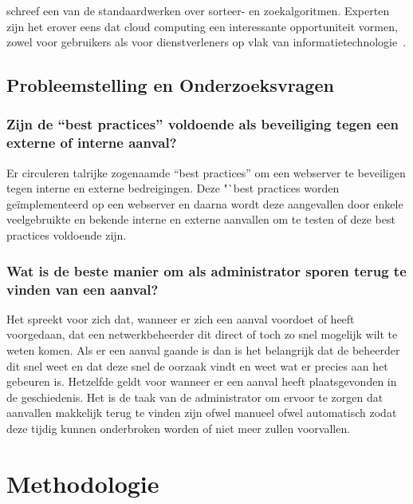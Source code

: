 \documentclass[pdftex,a4paper,12pt]{report}
\begin{document}
\cite{Knuth1998} schreef een van de standaardwerken over sorteer- en zoekalgoritmen. Experten zijn het erover eens dat cloud computing een interessante opportuniteit vormen, zowel voor gebruikers als voor dienstverleners op vlak van informatietechnologie~\citep{Creeger2009}.

\section{Probleemstelling en Onderzoeksvragen}
\label{sec:onderzoeksvragen}

\subsection{Zijn de "`best practices"' voldoende als beveiliging tegen een externe of interne aanval?}

Er circuleren talrijke zogenaamde "`best practices"' om een webserver te beveiligen tegen interne en externe bedreigingen. Deze "`best practices worden geïmplementeerd op een webserver en daarna wordt deze aangevallen door enkele veelgebruikte en bekende interne en externe aanvallen om te testen of deze best practices voldoende zijn.

\subsection{Wat is de beste manier om als administrator sporen terug te vinden van een aanval?}

Het spreekt voor zich dat, wanneer er zich een aanval voordoet of heeft voorgedaan, dat een netwerkbeheerder dit direct of toch zo snel mogelijk wilt te weten komen. Als er een aanval gaande is dan is het belangrijk dat de beheerder dit snel weet en dat deze snel de oorzaak vindt en weet wat er precies aan het gebeuren is. Hetzelfde geldt voor wanneer er een aanval heeft plaatsgevonden in de geschiedenis. Het is de taak van de administrator om ervoor te zorgen dat aanvallen makkelijk terug te vinden zijn ofwel manueel ofwel automatisch zodat deze tijdig kunnen onderbroken worden of niet meer zullen voorvallen.

\chapter{Methodologie}
\label{ch:methodologie}
\end{document}
